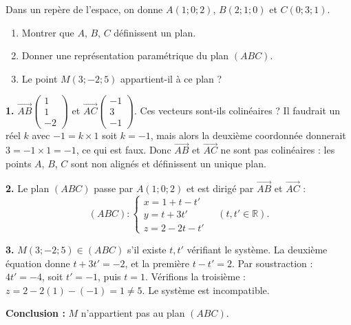 \documentclass[11pt]{article}
\begin{document}
\begin{exoresolu}
Dans un repère de l'espace, on donne $A(1;0;2)$, $B(2;1;0)$ et $C(0;3;1)$.
\begin{enumerate}
\item Montrer que $A$, $B$, $C$ définissent un plan.
\item Donner une représentation paramétrique du plan $(ABC)$.
\item Le point $M(3;-2;5)$ appartient-il à ce plan ?
\end{enumerate}
\tcblower
\textbf{1.} $\overrightarrow{AB}\begin{pmatrix} 1 \\ 1 \\ -2 \end{pmatrix}$ et $\overrightarrow{AC}\begin{pmatrix} -1 \\ 3 \\ -1 \end{pmatrix}$. Ces vecteurs sont-ils colinéaires ? Il faudrait un réel $k$ avec $-1=k\times 1$ soit $k=-1$, mais alors la deuxième coordonnée donnerait $3=-1\times 1=-1$, ce qui est faux. Donc $\overrightarrow{AB}$ et $\overrightarrow{AC}$ ne sont pas colinéaires : les points $A$, $B$, $C$ sont non alignés et définissent un unique plan.

\textbf{2.} Le plan $(ABC)$ passe par $A(1;0;2)$ et est dirigé par $\overrightarrow{AB}$ et $\overrightarrow{AC}$ :
\[ (ABC):\begin{cases} x = 1 + t - t' \\ y = t + 3t' \\ z = 2 - 2t - t' \end{cases} \quad (t,t'\in\mathbb{R}). \]

\textbf{3.} $M(3;-2;5)\in(ABC)$ s'il existe $t,t'$ vérifiant le système. La deuxième équation donne $t+3t'=-2$, et la première $t-t'=2$. Par soustraction : $4t'=-4$, soit $t'=-1$, puis $t=1$. Vérifions la troisième : $z=2-2(1)-(-1)=1\neq 5$. Le système est incompatible.

\textbf{Conclusion :} $M$ n'appartient pas au plan $(ABC)$.
\end{exoresolu}
\end{document}
